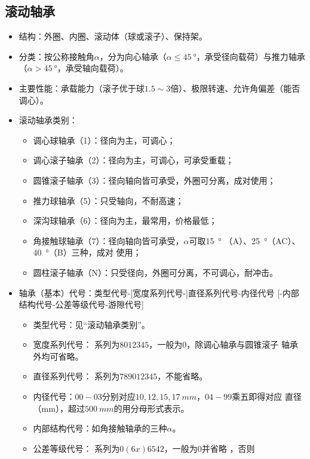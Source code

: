 \documentclass[12pt,a4paper]{article}
\newcommand{\tightlist}{\setlength{\parskip}{0pt}\setlength{\itemsep}{0pt}}
\newcommand{\hint}[1]{\textsf{（#1）}}
\newcommand{\minor}[1]{{\color{gray} #1}}
\begin{document}
\subsection{滚动轴承}
\begin{itemize}\tightlist
    \item 结构：外圈、内圈、滚动体\hint{球或滚子}、保持架。
    \item 分类：按公称接触角$\alpha$，分为向心轴承\hint{$\alpha\leq\SI{45}{\degree%
    }$，承受径向载荷}与推力轴承\hint{$\alpha>\SI{45}{\degree}$，承受轴向载荷}。
    \item 主要性能：承载能力\hint{滚子优于球$1.5\sim3$倍}、极限转速、允许角偏差\hint%
    {能否调心}。
    \item 滚动轴承类别：
    \begin{itemize}\tightlist
        \item 调心球轴承\hint{1}：径向为主，可调心；
        \item 调心滚子轴承\hint{2}：径向为主，可调心，可承受重载；
        \item 圆锥滚子轴承\hint{3}：径向轴向皆可承受，外圈可分离，成对使用；
        \item 推力球轴承\hint{5}：只受轴向，不耐高速；
        \item 深沟球轴承\hint{6}：径向为主，最常用，价格最低；
        \item 角接触球轴承\hint{7}：径向轴向皆可承受，$\alpha$可取\SI{15}{\degree}
        \hint{A}、\SI{25}{\degree}\hint{AC}、\SI{40}{\degree}\hint{B}三种，成对
        使用；
        \item 圆柱滚子轴承\hint{N}：只受径向，外圈可分离，不可调心，耐冲击。
    \end{itemize}
    \item 轴承（基本）代号：类型代号-[宽度系列代号-]直径系列代号-内径代号\minor{%
    [-内部结构代号-公差等级代号-游隙代号]}
    \begin{itemize}\tightlist
        \item 类型代号：见“滚动轴承类别”。
        \item 宽度系列代号：\minor{系列为$8012345$，}一般为$0$，除调心轴承与圆锥滚子
        轴承外均可省略。
        \item 直径系列代号：\minor{系列为$789012345$，}不能省略。
        \item 内径代号：$00-03$分别对应$10,12,15,\SI{17}{mm}$，$04-99$乘五即得对应
        直径\hint{mm}，超过$\SI{500}{mm}$的用分母形式表示。
        \item 内部结构代号：如角接触轴承的三种$\alpha$。
        \item 公差等级代号：\minor{系列为$0(6x)6542$，}一般为$0$并省略\minor{，否则
}
\end{itemize}
\end{itemize}
\end{document}
